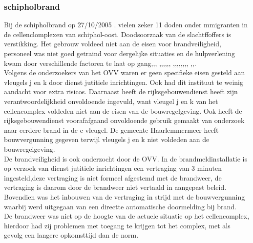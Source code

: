 \documentclass{article}
\begin{document}
	\subsubsection{schipholbrand}
	\newline \indent Bij de schipholbrand op 27/10/2005 . 
	vielen zeker 11 doden onder mmigranten in de cellenclomplexen van schiphol-oost. Doodsoorzaak van de slachtffoffers is verstikking. Het gebrouw voldeed niet aan de eisen voor brandveiligheid, personeel was niet goed getraind voor dergelijke situaties en de hulpverlening kwam door verschillende factoren te laat op gang\cite{schipholbrand27102005video},\cite{schipholbrand27102005video},\cite{onderzoeksraad2610schipholoost},
	\cite{schipholbrandvideoargos},\cite{nunl30052023feitenoverzicht},\cite{parlementairemonitorschipholbrand},\cite{videonpoNOVA13112008},\cite{rizoomes01052014schipholbrand},\cite{heuvelkroesschipholbrandcamerabeelden},
	\cite{wikiSchipholbrand},\cite{schipholbrand27102005video},\cite{onderzoeksraad2610schipholoost},\cite{schipholbrandvideoargos},\cite{nunl30052023feitenoverzicht},\cite{singeluitgeverijenSchipholbrand},\cite{eenvandaagschipholbrand},\cite{parlementairemonitorschipholbrand},
	\cite{videonpoNOVA13112008},\cite{rizoomes01052014schipholbrand},\cite{heuvelkroesschipholbrandcamerabeelden}. \\
	Volgens de onderzoekers van het OVV waren er geen specifieke eisen gesteld aan  vleugels j en k door dienst jutitiele inrichtingen. Ook had dit instituut te weinig aandacht voor extra risicos. Daarnaast heeft de rijksgebouwendienst heeft zijn verantwoordelijkheid onvoldoende ingevuld, want vleugel j en k van het cellencomplex voldeden niet aan de eisen van de bouwregelgeving. Ook heeft de rijksgebouwendienst  voorafafgaand onvoldoende gebruik gemaakt van onderzoek naar eerdere brand in de c-vleugel. De gemeente Haarlemmermeer heeft bouwvergunning gegeven terwijl vleugels  j en k niet voldeden aan de bouwregelgeving.\\
	De brandveiligheid is ook onderzocht door de OVV.
	In de brandmeldinstallatie is op verzoek van dienst jutitiele inrichtingen een vertraging van 3 minuten ingesteld,deze vertraging is niet formeel afgestemd met de brandweer, de vertraging is daarom door de brandweer niet vertaald in aangepast beleid. Bovendien was het inbouwen van de vertraging  in strijd met de bouwvergunning waarbij werd uitgegaan van een directte automatische doormelding bij brand. \\
	De brandweer was niet op de hoogte van de actuele situatie op het cellencomplex, hierdoor had zij problemen met toegang te krijgen tot het complex, met als gevolg een langere opkomsttijd dan de norm.
\end{document}

